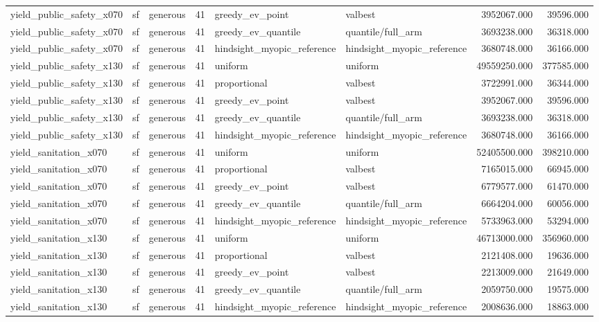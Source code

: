 \begin{tabular}{lllrllrr}
yield\_public\_safety\_x070 & sf & generous & 41 & greedy\_ev\_point & valbest & 3952067.000 & 39596.000 \\
yield\_public\_safety\_x070 & sf & generous & 41 & greedy\_ev\_quantile & quantile/full\_arm & 3693238.000 & 36318.000 \\
yield\_public\_safety\_x070 & sf & generous & 41 & hindsight\_myopic\_reference & hindsight\_myopic\_reference & 3680748.000 & 36166.000 \\
yield\_public\_safety\_x130 & sf & generous & 41 & uniform & uniform & 49559250.000 & 377585.000 \\
yield\_public\_safety\_x130 & sf & generous & 41 & proportional & valbest & 3722991.000 & 36344.000 \\
yield\_public\_safety\_x130 & sf & generous & 41 & greedy\_ev\_point & valbest & 3952067.000 & 39596.000 \\
yield\_public\_safety\_x130 & sf & generous & 41 & greedy\_ev\_quantile & quantile/full\_arm & 3693238.000 & 36318.000 \\
yield\_public\_safety\_x130 & sf & generous & 41 & hindsight\_myopic\_reference & hindsight\_myopic\_reference & 3680748.000 & 36166.000 \\
yield\_sanitation\_x070 & sf & generous & 41 & uniform & uniform & 52405500.000 & 398210.000 \\
yield\_sanitation\_x070 & sf & generous & 41 & proportional & valbest & 7165015.000 & 66945.000 \\
yield\_sanitation\_x070 & sf & generous & 41 & greedy\_ev\_point & valbest & 6779577.000 & 61470.000 \\
yield\_sanitation\_x070 & sf & generous & 41 & greedy\_ev\_quantile & quantile/full\_arm & 6664204.000 & 60056.000 \\
yield\_sanitation\_x070 & sf & generous & 41 & hindsight\_myopic\_reference & hindsight\_myopic\_reference & 5733963.000 & 53294.000 \\
yield\_sanitation\_x130 & sf & generous & 41 & uniform & uniform & 46713000.000 & 356960.000 \\
yield\_sanitation\_x130 & sf & generous & 41 & proportional & valbest & 2121408.000 & 19636.000 \\
yield\_sanitation\_x130 & sf & generous & 41 & greedy\_ev\_point & valbest & 2213009.000 & 21649.000 \\
yield\_sanitation\_x130 & sf & generous & 41 & greedy\_ev\_quantile & quantile/full\_arm & 2059750.000 & 19575.000 \\
yield\_sanitation\_x130 & sf & generous & 41 & hindsight\_myopic\_reference & hindsight\_myopic\_reference & 2008636.000 & 18863.000 \\

\end{tabular}
